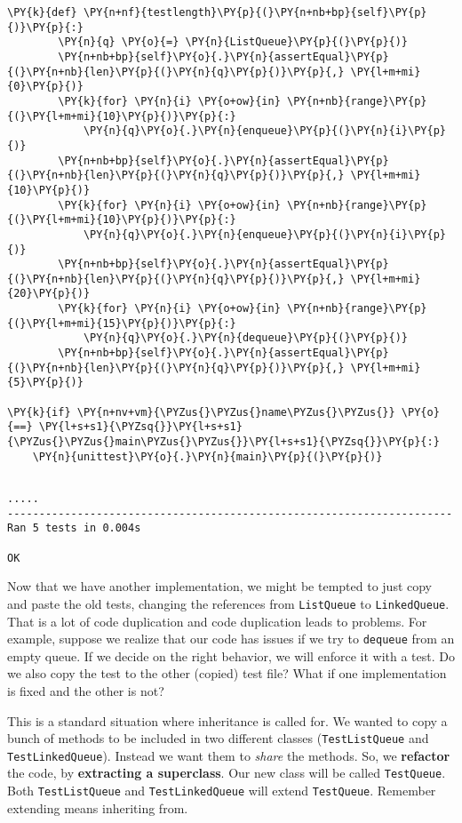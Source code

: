 \begin{Verbatim}[commandchars=\\\{\}]
    \PY{k}{def} \PY{n+nf}{testlength}\PY{p}{(}\PY{n+nb+bp}{self}\PY{p}{)}\PY{p}{:}
        \PY{n}{q} \PY{o}{=} \PY{n}{ListQueue}\PY{p}{(}\PY{p}{)}
        \PY{n+nb+bp}{self}\PY{o}{.}\PY{n}{assertEqual}\PY{p}{(}\PY{n+nb}{len}\PY{p}{(}\PY{n}{q}\PY{p}{)}\PY{p}{,} \PY{l+m+mi}{0}\PY{p}{)}
        \PY{k}{for} \PY{n}{i} \PY{o+ow}{in} \PY{n+nb}{range}\PY{p}{(}\PY{l+m+mi}{10}\PY{p}{)}\PY{p}{:}
            \PY{n}{q}\PY{o}{.}\PY{n}{enqueue}\PY{p}{(}\PY{n}{i}\PY{p}{)}
        \PY{n+nb+bp}{self}\PY{o}{.}\PY{n}{assertEqual}\PY{p}{(}\PY{n+nb}{len}\PY{p}{(}\PY{n}{q}\PY{p}{)}\PY{p}{,} \PY{l+m+mi}{10}\PY{p}{)}
        \PY{k}{for} \PY{n}{i} \PY{o+ow}{in} \PY{n+nb}{range}\PY{p}{(}\PY{l+m+mi}{10}\PY{p}{)}\PY{p}{:}
            \PY{n}{q}\PY{o}{.}\PY{n}{enqueue}\PY{p}{(}\PY{n}{i}\PY{p}{)}
        \PY{n+nb+bp}{self}\PY{o}{.}\PY{n}{assertEqual}\PY{p}{(}\PY{n+nb}{len}\PY{p}{(}\PY{n}{q}\PY{p}{)}\PY{p}{,} \PY{l+m+mi}{20}\PY{p}{)}
        \PY{k}{for} \PY{n}{i} \PY{o+ow}{in} \PY{n+nb}{range}\PY{p}{(}\PY{l+m+mi}{15}\PY{p}{)}\PY{p}{:}
            \PY{n}{q}\PY{o}{.}\PY{n}{dequeue}\PY{p}{(}\PY{p}{)}
        \PY{n+nb+bp}{self}\PY{o}{.}\PY{n}{assertEqual}\PY{p}{(}\PY{n+nb}{len}\PY{p}{(}\PY{n}{q}\PY{p}{)}\PY{p}{,} \PY{l+m+mi}{5}\PY{p}{)}

\PY{k}{if} \PY{n+nv+vm}{\PYZus{}\PYZus{}name\PYZus{}\PYZus{}} \PY{o}{==} \PY{l+s+s1}{\PYZsq{}}\PY{l+s+s1}{\PYZus{}\PYZus{}main\PYZus{}\PYZus{}}\PY{l+s+s1}{\PYZsq{}}\PY{p}{:}
    \PY{n}{unittest}\PY{o}{.}\PY{n}{main}\PY{p}{(}\PY{p}{)}
\end{Verbatim}

\begin{Verbatim}

.....
----------------------------------------------------------------------
Ran 5 tests in 0.004s

OK

\end{Verbatim}


Now that we have another implementation, we might be tempted to just copy and paste the old tests, changing the references from \texttt{ListQueue} to \texttt{LinkedQueue}.
That is a lot of code duplication and code duplication leads to problems.
For example, suppose we realize that our code has issues if we try to \texttt{dequeue} from an empty queue.
If we decide on the right behavior, we will enforce it with a test.
Do we also copy the test to the other (copied) test file?
What if one implementation is fixed and the other is not?


This is a standard situation where inheritance is called for.
We wanted to copy a bunch of methods to be included in two different classes (\texttt{TestListQueue} and \texttt{TestLinkedQueue}).
Instead we want them to \emph{share} the methods.
So, we \textbf{refactor} the code, by \textbf{extracting a superclass}.
Our new class will be called \texttt{TestQueue}.
Both \texttt{TestListQueue} and \texttt{TestLinkedQueue} will extend \texttt{TestQueue}.
Remember extending means inheriting from.

